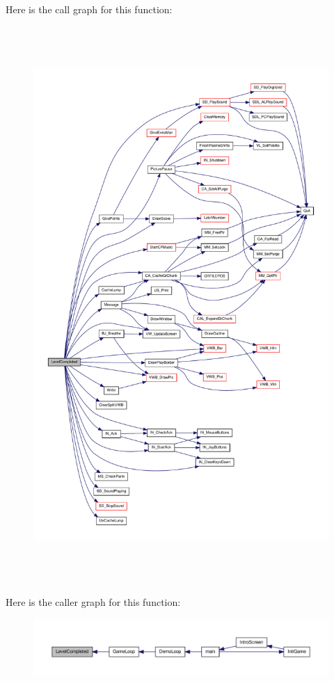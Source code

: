 Here is the call graph for this function:
\nopagebreak
\begin{figure}[H]
\begin{center}
\leavevmode
\includegraphics[height=600pt]{WL__INTER_8C_ab396c53c02f20e288d2d718c0ee64728_cgraph}
\end{center}
\end{figure}




Here is the caller graph for this function:
\nopagebreak
\begin{figure}[H]
\begin{center}
\leavevmode
\includegraphics[width=400pt]{WL__INTER_8C_ab396c53c02f20e288d2d718c0ee64728_icgraph}
\end{center}
\end{figure}


